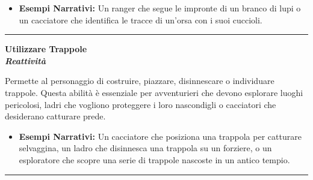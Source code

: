 \documentclass[../manuale_main.tex]{subfiles}
\begin{document}
\begin{itemize}
\item \textbf{Esempi Narrativi:} Un ranger che segue le impronte di un branco di lupi o un cacciatore che identifica le tracce di un'orsa con i suoi cuccioli.
\end{itemize}

\vspace{0.5cm}
\noindent
\begin{center}
\rule{\textwidth}{0.4pt} 
\end{center}
\vspace{0.5cm}

\begin{center}
\textbf{\large{Utilizzare Trappole}}\\ \textit{\textbf{Reattività}}\\
\end{center}
Permette al personaggio di costruire, piazzare, disinnescare o individuare trappole. Questa abilità è essenziale per avventurieri che devono esplorare luoghi pericolosi, ladri che vogliono proteggere i loro nascondigli o cacciatori che desiderano catturare prede.

\begin{itemize}
\item \textbf{Esempi Narrativi:} Un cacciatore che posiziona una trappola per catturare selvaggina, un ladro che disinnesca una trappola su un forziere, o un esploratore che scopre una serie di trappole nascoste in un antico tempio.
\end{itemize}


\vspace{0.5cm}
\noindent
\begin{center}
\rule{\textwidth}{0.4pt} 
\end{center}
\vspace{0.5cm}


\end{document}

